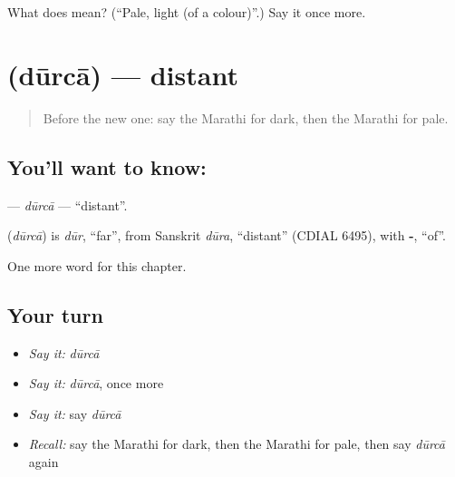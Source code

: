 \begin{tcolorbox}[breakable,colback=teal!4,colframe=teal!35!black,title={Before you move on}]
What does  mean? (\textquotedblleft{}Pale, light (of a colour)\textquotedblright{}.) Say it once more.
\end{tcolorbox}
\section[\texorpdfstring{\mr{दूरचा} (dūrcā)}{दूरचा (dūrcā)}]{ (dūrcā) — distant}

\label{lesson:MR-C233-durca}



\begin{quote}
Before the new one: say the Marathi for dark, then the Marathi for pale.
\end{quote}

\subsection*{You'll want to know: }
\textbf{} — \emph{dūrcā} — \textquotedblleft{}distant\textquotedblright{}.

\begin{cousinweb}
\textbf{} (\emph{dūrcā}) is \emph{dūr}, \textquotedblleft{}far\textquotedblright{}, from Sanskrit \emph{dūra}, \textquotedblleft{}distant\textquotedblright{} (CDIAL 6495), with \textbf{-}, \textquotedblleft{}of\textquotedblright{}.
\end{cousinweb}

\begin{grammarlens}[title={What you've built}]
One more word for this chapter.
\end{grammarlens}

\subsection*{Your turn}
\begin{itemize}
\raggedright
  \item \emph{Say it:} \emph{dūrcā}
  \item \emph{Say it:} \emph{dūrcā}, once more
  \item \emph{Say it:} say \emph{dūrcā}
  \item \emph{Recall:} say the Marathi for dark, then the Marathi for pale, then say \emph{dūrcā} again
\end{itemize}

